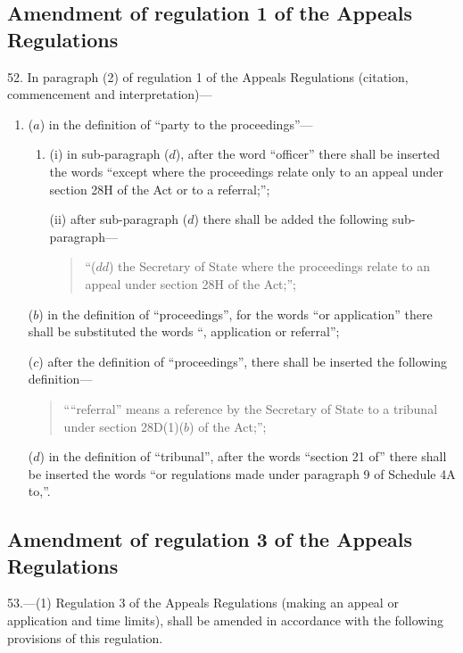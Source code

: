 \documentclass[a4paper]{article}
\newcommand{\parthead}{}
\begin{document}
\renewcommand\parthead{--- Part XIII}

\subsection[52. Amendment of regulation 1 of the Appeals
Regulations]{Amendment of regulation 1 of the Appeals
Regulations}

52. In paragraph (2) of regulation 1 of the Appeals Regulations
(citation, commencement and interpretation)—
\begin{enumerate}\item[]
($a$) in the definition of “party to the proceedings”—
\begin{enumerate}\item[]
(i) in sub-paragraph ($d$), after the word “officer” there shall be inserted the
words “except where the proceedings relate only to an appeal under section 28H
of the Act or to a referral;”;

(ii) after sub-paragraph ($d$) there shall be added the following sub-paragraph—
\begin{quotation}
“($dd$) the Secretary of State where the proceedings relate to an appeal under
section 28H of the Act;”;
\end{quotation}
\end{enumerate}

($b$) in the definition of “proceedings”, for the words “or application” there
shall be substituted the words “, application or referral”;

($c$) after the definition of “proceedings”, there shall be inserted the following
definition—
\begin{quotation}
““referral” means a reference by the Secretary of State to a tribunal under
section 28D(1)($b$) of the Act;”;
\end{quotation}

($d$) in the definition of “tribunal”, after the words “section 21 of” there shall
be inserted the words “or regulations made under paragraph 9 of Schedule 4A
to,”.
\end{enumerate}

\subsection[53. Amendment of regulation 3 of the Appeals Regulations]{Amendment of regulation 3 of the Appeals Regulations}

53.—(1) Regulation 3 of the
Appeals Regulations (making an appeal or application and time limits), shall be
amended in accordance with the following provisions of this regulation.
\end{document}
